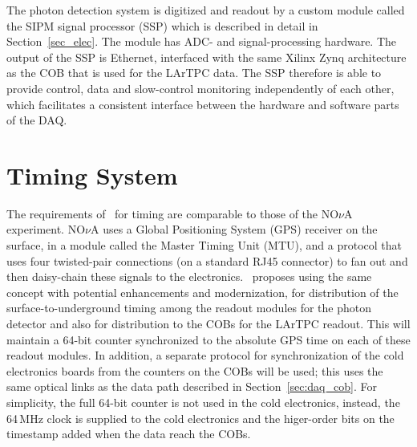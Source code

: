 The photon detection system is digitized and readout by a custom
module called the SIPM signal processor (SSP) which is described in
detail in Section~\ref{sec_elec}.%
The module has ADC- and signal-processing hardware.  The output of the
SSP is Ethernet, interfaced with the same Xilinx Zynq architecture as
the COB that is used for the LArTPC data. The SSP therefore is able
to provide control, data and slow-control monitoring independently
of each other, which facilitates a consistent interface between the
hardware and software parts of the DAQ.

\section{Timing System }
\label{sec:daq_time}

The  requirements of \LBNE\ for timing are comparable to those of the 
NO$\nu$A experiment.  NO$\nu$A uses a Global Positioning System (GPS)
receiver on the surface, in a module called the Master Timing Unit
(MTU), and a protocol that uses four twisted-pair connections (on a
standard RJ45 connector) to fan out and then daisy-chain these signals
to the electronics.  \LBNE\ proposes using the same concept with potential
enhancements and modernization, for distribution of the 
surface-to-underground timing among the readout modules for the photon
detector and also for distribution to the COBs for the LArTPC readout.
This will maintain a 64-bit counter synchronized to the absolute GPS
time on each of these readout modules.  In addition, a
separate protocol for synchronization of the cold electronics
boards from the counters on the COBs will be used; this uses the same optical links
as the data path described in Section~\ref{sec:daq_cob}.  
For simplicity, the full 64-bit counter is not used in the cold electronics, instead, 
the 64\,MHz clock is supplied to the cold electronics and the higer-order bits on 
the timestamp added when the data reach the COBs.

